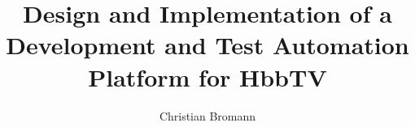 \author{Christian Bromann}
\title{Design and Implementation of a Development and Test Automation Platform for HbbTV}





\frontmatter
    
   	\thispagestyle{empty}
    \cleardoublepage

    
    \thispagestyle{empty}
    \cleardoublepage

    
    \thispagestyle{empty}
    \cleardoublepage

    
    \thispagestyle{empty}
    \cleardoublepage


    
    \thispagestyle{empty}
    \cleardoublepage

    
    \thispagestyle{empty}

    \tableofcontents
    \thispagestyle{empty}

\mainmatter %

    
    
    
    
    
    
    

\backmatter %
    \listoffigures
    \thispagestyle{empty}

    \listoflistings
    \thispagestyle{empty}

    \listoftables
    \thispagestyle{empty}

    

    
    

    


